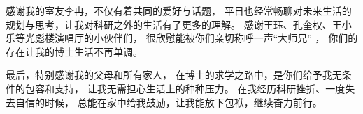 \begin{thanks}
感谢我的室友李冉，不仅有着共同的爱好与话题，
平日也经常畅聊对未来生活的规划与思考，让我对科研之外的生活有了更多的理解。
感谢王珏、孔奎权、王小乐等光彪楼演唱厅的小伙伴们，
很欣慰能被你们亲切称呼一声``{大师兄}'' ，
你们的存在让我的博士生活不再单调。

最后，特别感谢我的父母和所有家人，
在博士的求学之路中，是你们给予我无条件的包容和支持，
让我无需担心生活上的种种压力。
在我经历科研挫折、一度失去自信的时候，
总能在家中给我鼓励，让我能放下包袱，继续奋力前行。


\end{thanks}
